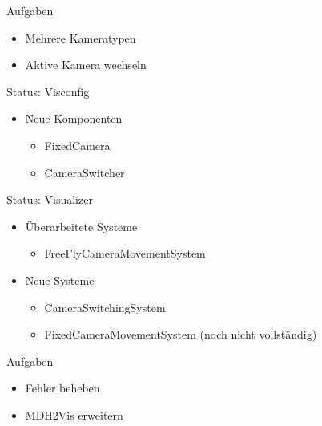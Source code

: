 \documentclass{../presentation}
\begin{document}
\frame[plain]{\titlepage}

\begin{frame}{Aufgaben}
    \begin{itemize}
        \item Mehrere Kameratypen
        \item Aktive Kamera wechseln
    \end{itemize}
\end{frame}

\begin{frame}{Status: Visconfig}
    \begin{itemize}
        \item Neue Komponenten
        \begin{itemize}
            \item FixedCamera
            \item CameraSwitcher
        \end{itemize}
    \end{itemize}
\end{frame}

\begin{frame}{Status: Visualizer}
    \begin{itemize}
        \item Überarbeitete Systeme
        \begin{itemize}
            \item FreeFlyCameraMovementSystem
        \end{itemize}
        \item Neue Systeme
        \begin{itemize}
            \item CameraSwitchingSystem
            \item FixedCameraMovementSystem (noch nicht vollständig)
        \end{itemize}
    \end{itemize}
\end{frame}

\begin{frame}{Aufgaben}
    \begin{itemize}
        \item Fehler beheben
        \item MDH2Vis erweitern
    \end{itemize}
\end{frame}
\end{document}
